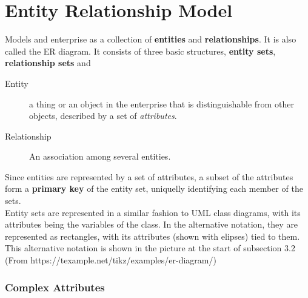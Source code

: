 \documentclass[11pt,a4paper,twocolumn]{book}
\begin{document}
\section{Entity Relationship Model}

Models and enterprise as a collection of \textbf{entities} and \textbf{relationships}. It is also called the ER diagram. It consists of three basic structures, \textbf{entity sets}, \textbf{relationship sets} and 

\begin{description}
\item[Entity] a thing or an object in the enterprise that is distinguishable from other objects, described by a set of \textit{attributes}.
\item[Relationship] An association among several entities.
\end{description}

Since entities are represented by a set of attributes, a subset of the attributes form a \textbf{primary key} of the entity set, uniquelly identifying each member of the sets.\\

Entity sets are represented in a similar fashion to UML class diagrams, with its attributes being the variables of the class. In the alternative notation, they are represented as rectangles, with its attributes (shown with elipses) tied to them. This alternative notation is shown in the picture at the start of subsection 3.2 (From https://texample.net/tikz/examples/er-diagram/)

\subsubsection{Complex Attributes}
\end{document}
